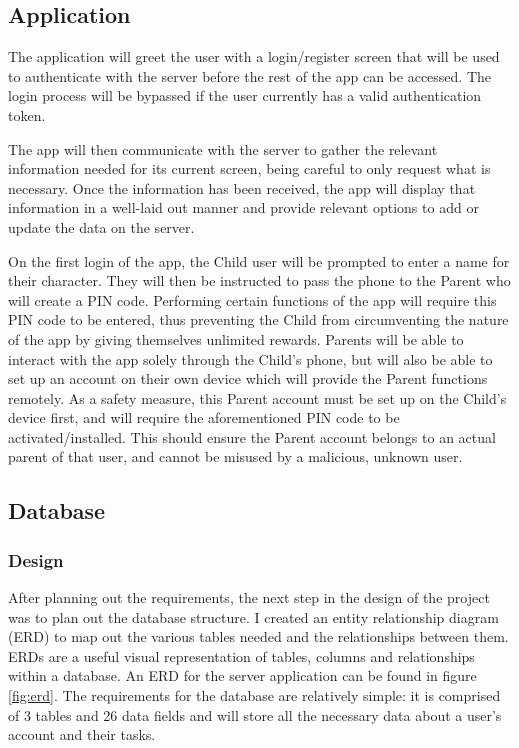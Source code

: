 \subsection{Application}
The application will greet the user with a login/register screen that will be used to authenticate with the server before the rest of the app can be accessed.
The login process will be bypassed if the user currently has a valid authentication token.

The app will then communicate with the server to gather the relevant information needed for its current screen, being careful to only request what is necessary.
Once the information has been received, the app will display that information in a well-laid out manner and provide relevant options to add or update the data on the server.

On the first login of the app, the Child user will be prompted to enter a name for their character. 
They will then be instructed to pass the phone to the Parent who will create a PIN code.
Performing certain functions of the app will require this PIN code to be entered, thus preventing the Child from circumventing the nature of the app by giving themselves unlimited rewards.
Parents will be able to interact with the app solely through the Child's phone, but will also be able to set up an account on their own device which will provide the Parent functions remotely.
As a safety measure, this Parent account must be set up on the Child's device first, and will require the aforementioned PIN code to be activated/installed. 
This should ensure the Parent account belongs to an actual parent of that user, and cannot be misused by a malicious, unknown user. 

\subsection{Database}
\subsubsection{Design}
After planning out the requirements, the next step in the design of the project was to plan out the database structure.
I created an entity relationship diagram (ERD) to map out the various tables needed and the relationships between them.
ERDs are a useful visual representation of tables, columns and relationships within a database.
An ERD for the server application can be found in figure \ref{fig:erd}.
The requirements for the database are relatively simple: it is comprised of 3 tables and 26 data fields and will store all the necessary data about a user's account and their tasks.

